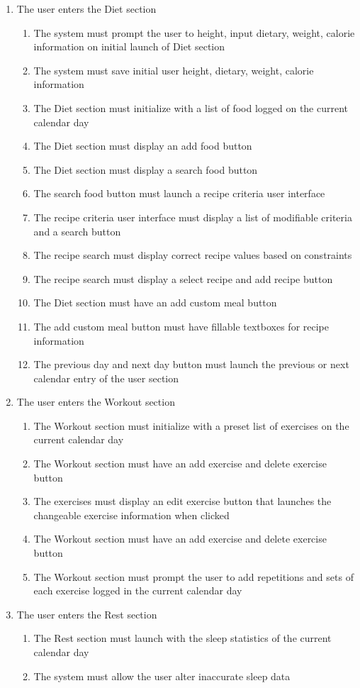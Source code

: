 \documentclass[12pt,letterpaper]{article}
\begin{document}
\begin{enumerate}[{BE}1.]
\item The user enters the Diet section
\begin{enumerate}[resume*]
	\item  The system must prompt the user to height, input dietary, weight,  calorie information on initial launch of Diet section
	\item  The system must save initial user height, dietary, weight, calorie information
	\item  The Diet section must initialize with a list of food logged on the current calendar day
	\item  The Diet section must display an add food button
	\item  The Diet section must display a search food button
	\item  The search food button must launch a recipe criteria user interface
	\item  The recipe criteria user interface must display a list of modifiable criteria and a search button
	\item  The recipe search must display correct recipe values based on constraints
	\item  The recipe search must display a select recipe and add recipe button
	\item  The Diet section must have an add custom meal button
	\item  The add custom meal button must have fillable textboxes for recipe information
	\item  The previous day and next day button must launch the previous or next calendar entry of the user section
\end{enumerate}

\item The user enters the Workout section
\begin{enumerate}[resume*]
	\item  The Workout section must initialize with a preset list of exercises on the current calendar day
	\item  The Workout section must have an add exercise and delete exercise button
	\item  The exercises must display an edit exercise button that launches the changeable exercise information when clicked
	\item  The Workout section must have an add exercise and delete exercise button
	\item  The Workout section must prompt the user to add repetitions and sets of each exercise logged in the current calendar day
\end{enumerate}

\item The user enters the Rest section
\begin{enumerate}[resume*]
	\item  The Rest section must launch with the sleep statistics of the current calendar day
	\item  The system must allow the user alter inaccurate sleep data
\end{enumerate}
\end{enumerate}
\end{document}
